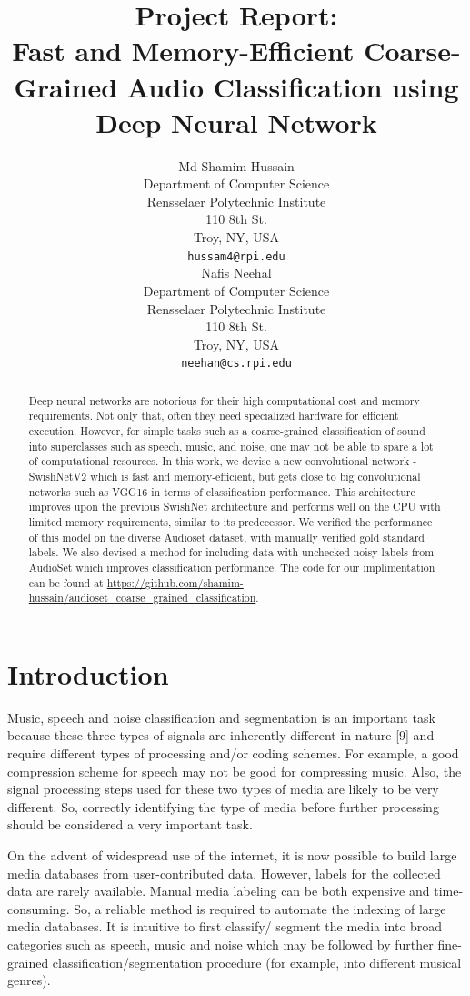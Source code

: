\documentclass{article}
\title{Project Report:\\Fast and Memory-Efficient Coarse-Grained Audio Classification using Deep Neural Network}
\author{
Md Shamim Hussain\\
Department of Computer Science\\
Rensselaer Polytechnic Institute\\
110 8th St.\\ Troy, NY, USA\\
\texttt{hussam4@rpi.edu} \\
\And
Nafis Neehal\\
Department of Computer Science\\
Rensselaer Polytechnic Institute\\
110 8th St.\\ Troy, NY, USA\\
\texttt{neehan@cs.rpi.edu} \\
}
\begin{document}
\maketitle

\begin{abstract}
  Deep neural networks are notorious for their high computational cost and memory requirements. Not only that, often they need specialized hardware for efficient execution. However, for simple tasks such as a coarse-grained classification of sound into superclasses such as speech, music, and noise, one may not be able to spare a lot of computational resources. In this work, we devise a new convolutional network - SwishNetV2 which is fast and memory-efficient, but gets close to big convolutional networks such as VGG16 in terms of classification performance. This architecture improves upon the previous SwishNet architecture and performs well on the CPU with limited memory requirements, similar to its predecessor. We verified the performance of this model on the diverse Audioset dataset, with manually verified gold standard labels. We also devised a method for including data with unchecked noisy labels from AudioSet which improves classification performance. The code for our implimentation can be found at \url{https://github.com/shamim-hussain/audioset_coarse_grained_classification}.
\end{abstract}

\section{Introduction}
Music, speech and noise classification and segmentation is an important task because these three types of signals are inherently different in nature [9] and require different types of processing and/or coding schemes. For example, a good compression scheme for speech may not be good for compressing music. Also, the signal processing steps used for these two types of media are likely to be very different. So, correctly identifying the type of media before further processing should be considered a very important task. 

On the advent of widespread use of the internet, it is now possible to build large media databases from user-contributed data. However, labels for the collected data are rarely available. Manual media labeling can be both expensive and time-consuming. So, a reliable method is required to automate the indexing of large media databases. It is intuitive to first classify/ segment the media into broad categories such as speech, music and noise which may be followed by further fine-grained classification/segmentation procedure (for example, into different musical genres). 
\end{document}
